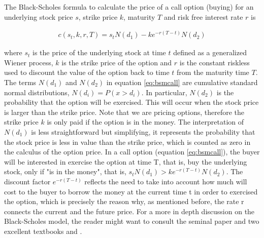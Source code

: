 \documentclass[11pt,twocolumn]{article}
\begin{document}
The Black-Scholes formula to calculate the price of a call option (buying) for an underlying stock  price $s$, strike price $k$, maturity $T$ and risk free interest rate $r$ is 

\begin{equation}
\begin{split}
 c(s_t,k,r,T)  = s_t N(d_1) - k e^{-r(T-t)}N(d_2)
 \end{split}
  \label{eq:bsmcall}
\end{equation}
 
where $s_t$ is the price of the underlying stock at time $t$ defined as a generalized Wiener process, $k$ is the strike price of the option and $r$ is the constant riskless used to discount the value of the option back to time $t$ from the maturity time $T$.
The terms $N(d_1)$ and $N(d_2)$ in equation \ref{eq:bsmcall} are cumulative standard normal distributions, $N(d_i) = P(x > d_i)$. In particular, $N(d_2)$ is the probability that the option will be exercised. This will occur when the stock price is larger than the strike price. Note that we are pricing options, therefore the strike price $k$ is only paid if the option is in the money. The interpretation of $N(d_1)$ is less straightforward but simplifying, it represents the probability that the stock price is less in value than the strike price, which is counted as zero in the calculus of the option price. In a call option (equation \ref{eq:bsmcall}), the buyer will be interested in exercise the option at time T, that is, buy the underlying stock, only if "is in the money", that is, $s_t N(d_1) > k e^{-r(T-t)}N(d_2)$. The discount factor $e^{-r(T-t)}$ reflects the need to take into account how much will cost to the buyer to borrow the money at the current time t in order to exercised the option, which is precisely the reason why, as mentioned before, the rate r connects the current and the future price. For a more in depth discussion on the Black-Scholes model, the reader might want to consult the seminal paper \citep{black_pricing_1973} and two excellent textbooks \citep{hull_options_2005} and \citep{duffie_dynamic_2001}.

\end{document}
